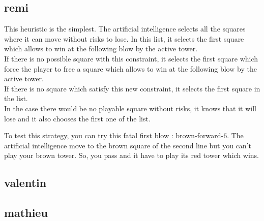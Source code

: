 \documentclass[a4paper, 11pt]{article}
\begin{document}
\subsection{remi}
This heuristic is the simplest. The artificial intelligence selects all the squares where it can move without risks to lose. In this list, it selects the first square which allows to win at the following blow by the active tower.\\
If there is no possible square with this constraint, it selects the first square which force the player to free a square which allows to win at the following blow by the active tower.\\
If there is no square which satisfy this new constraint, it selects the first square in the list.\\
In the case there would be no playable square without risks, it knows that it will lose and it also chooses the first one of the list.

To test this strategy, you can try this fatal first blow : brown-forward-6. The artificial intelligence move to the brown square of the second line but you can't play your brown tower. So, you pass and it have to play its red tower which wins.

\subsection{valentin}


\subsection{mathieu}
\end{document}
